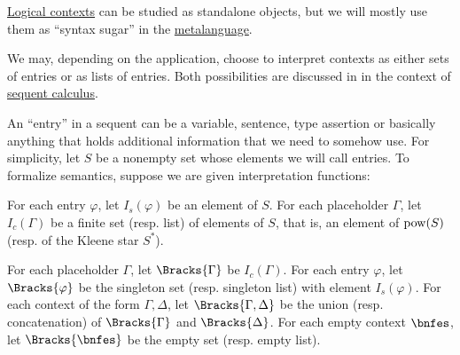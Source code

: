 \begin{definition}\label{def:logical_context_semantics}
  \hyperref[def:logical_context]{Logical contexts} can be studied as standalone objects, but we will mostly use them as \enquote{syntax sugar} in the \hyperref[con:metalogic]{metalanguage}.

  We may, depending on the application, choose to interpret contexts as either sets of entries or as lists of entries. Both possibilities are discussed in  in the context of \hyperref[rem:sequent_calculus]{sequent calculus}.

  An \enquote{entry} in a sequent can be a variable, sentence, type assertion or basically anything that holds additional information that we need to somehow use. For simplicity, let \( S \) be a nonempty set whose elements we will call entries. To formalize semantics, suppose we are given interpretation functions:
  \begin{thmenum}[series=def:logical_context_semantics]
     For each entry \( \varphi \), let \( I_s(\varphi) \) be an element of \( S \).
     For each placeholder \( \Gamma \), let \( I_c(\Gamma) \) be a finite set (resp. list) of elements of \( S \), that is, an element of \( \operatorname{pow}(S) \) (resp. of the Kleene star \( S^* \)).
  \end{thmenum}

  \begin{thmenum}[series=def:logical_context_semantics]
     For each placeholder \( \Gamma \), let \( \Bracks{\Gamma} \) be \( I_c(\Gamma) \).
     For each entry \( \varphi \), let \( \Bracks{\varphi} \) be the singleton set (resp. singleton list) with element \( I_s(\varphi) \).
     For each context of the form \( \Gamma, \Delta \), let \( \Bracks{\Gamma, \Delta} \) be the union (resp. concatenation) of \( \Bracks{\Gamma} \) and \( \Bracks{\Delta} \).
     For each empty context \( \bnfes \), let \( \Bracks{\bnfes} \) be the empty set (resp. empty list).
  \end{thmenum}
\end{definition}

